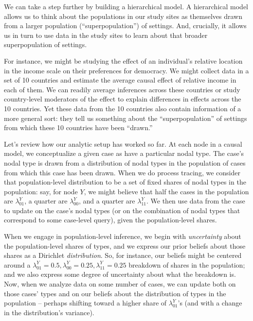 \documentclass[
  12pt,
]{book}
\begin{document}
We can take a step further by building a hierarchical model. A hierarchical model allows us to think about the populations in our study sites as themselves drawn from a larger population (``superpopulation'') of settings. And, crucially, it allows us in turn to use data in the study sites to learn about that broader superpopulation of settings.

For instance, we might be studying the effect of an individual's relative location in the income scale on their preferences for democracy. We might collect data in a set of 10 countries and estimate the average causal effect of relative income in each of them. We can readily average inferences across these countries or study country-level moderators of the effect to explain differences in effects across the 10 countries. Yet these data from the 10 countries also contain information of a more general sort: they tell us something about the ``superpopulation'' of settings from which these 10 countries have been ``drawn.''

Let's review how our analytic setup has worked so far. At each node in a causal model, we conceptualize a given case as have a particular nodal type. The case's nodal type is drawn from a distribution of nodal types in the population of cases from which this case has been drawn. When we do process tracing, we consider that population-level distribution to be a set of fixed shares of nodal types in the population: say, for node \(Y\), we might believe that half the cases in the population are \(\lambda^Y_{01}\), a quarter are \(\lambda^Y_{00}\), and a quarter are \(\lambda^Y_{11}\). We then use data from the case to update on the case's nodal types (or on the combination of nodal types that correspond to some case-level query), given the population-level shares.

When we engage in population-level inference, we begin with \emph{uncertainty} about the population-level shares of types, and we express our prior beliefs about those shares as a Dirichlet \emph{distribution}. So, for instance, our beliefs might be centered around a \(\lambda^Y_{01}=0.5, \lambda^Y_{00}=0.25, \lambda^Y_{11}=0.25\) breakdown of shares in the population; and we also express some degree of uncertainty about what the breakdown is. Now, when we analyze data on some number of cases, we can update both on those cases' types and on our beliefs about the distribution of types in the population -- perhaps shifting toward a higher share of \(\lambda^Y_{01}\)'s (and with a change in the distribution's variance).
\end{document}
